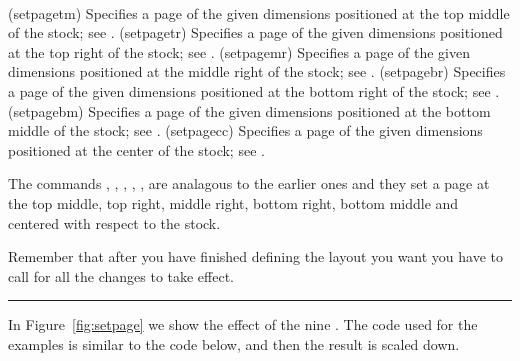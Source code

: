\begin{syntax}
\cmd{\setpagetm} \\
\cmd{\setpagetr} \\
\cmd{\setpagemr} \\
\cmd{\setpagebr} \\
\cmd{\setpagebm} \\
\cmd{\setpagecc} \\
\end{syntax}
\glossary(setpagetm)%
  {}%
  {Specifies a page of the given dimensions positioned at the top middle
   of the stock; see .}
\glossary(setpagetr)%
  {}%
  {Specifies a page of the given dimensions positioned at the top right
   of the stock; see .}
\glossary(setpagemr)%
  {}%
  {Specifies a page of the given dimensions positioned at the middle right
   of the stock; see .}
\glossary(setpagebr)%
  {}%
  {Specifies a page of the given dimensions positioned at the bottom right
   of the stock; see .}
\glossary(setpagebm)%
  {}%
  {Specifies a page of the given dimensions positioned at the bottom middle
   of the stock; see .}
\glossary(setpagecc)%
  {}%
  {Specifies a page of the given dimensions positioned at the center
   of the stock; see .}

    The commands \cmd{\setpagetm}, \cmd{\setpagetr}, \cmd{\setpagemr},
\cmd{\setpagebr}, \cmd{\setpagebm}, \cmd{\setpagecc} are analagous to the
earlier ones and they set a page at the top middle, top right, middle right,
bottom right, bottom middle and centered with respect to the stock.


Remember that after you have finished defining the layout you want you
have to call \cmd{\checkandfixthelayout} for all the changes to take
effect.

\fancybreak{}

In Figure~\ref{fig:setpage} we show the effect of the nine
\cmd{\setpageXX}. The code used for the examples is similar to the
code below, and then the result is scaled down.

